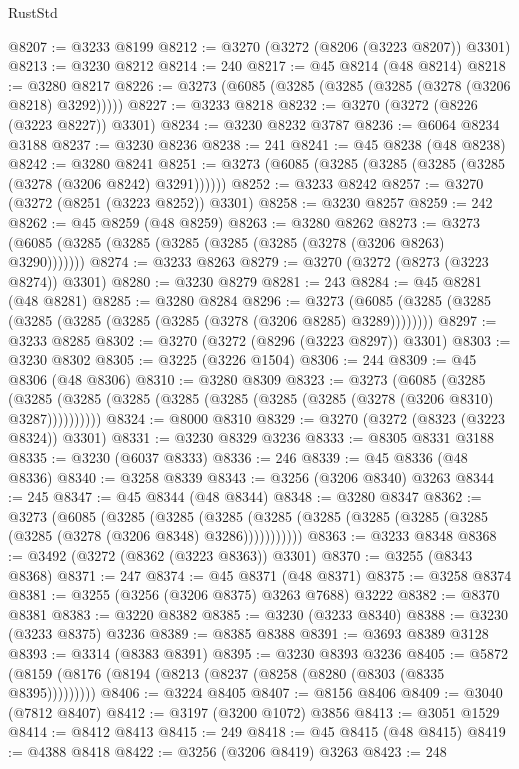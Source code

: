 \begin{lexlean}{RustStd}
\begin{coremodule}
@8207 := @3233 @8199
@8212 := @3270 (@3272 (@8206 (@3223 @8207)) @3301)
@8213 := @3230 @8212
@8214 := 240
@8217 := @45 @8214 (@48 @8214)
@8218 := @3280 @8217
@8226 := @3273 (@6085 (@3285 (@3285 (@3285 (@3278 (@3206 @8218) @3292)))))
@8227 := @3233 @8218
@8232 := @3270 (@3272 (@8226 (@3223 @8227)) @3301)
@8234 := @3230 @8232 @3787
@8236 := @6064 @8234 @3188
@8237 := @3230 @8236
@8238 := 241
@8241 := @45 @8238 (@48 @8238)
@8242 := @3280 @8241
@8251 := @3273 (@6085 (@3285 (@3285 (@3285 (@3285 (@3278 (@3206 @8242) @3291))))))
@8252 := @3233 @8242
@8257 := @3270 (@3272 (@8251 (@3223 @8252)) @3301)
@8258 := @3230 @8257
@8259 := 242
@8262 := @45 @8259 (@48 @8259)
@8263 := @3280 @8262
@8273 := @3273 (@6085 (@3285 (@3285 (@3285 (@3285 (@3285 (@3278 (@3206 @8263) @3290)))))))
@8274 := @3233 @8263
@8279 := @3270 (@3272 (@8273 (@3223 @8274)) @3301)
@8280 := @3230 @8279
@8281 := 243
@8284 := @45 @8281 (@48 @8281)
@8285 := @3280 @8284
@8296 := @3273 (@6085 (@3285 (@3285 (@3285 (@3285 (@3285 (@3285 (@3278 (@3206 @8285) @3289))))))))
@8297 := @3233 @8285
@8302 := @3270 (@3272 (@8296 (@3223 @8297)) @3301)
@8303 := @3230 @8302
@8305 := @3225 (@3226 @1504)
@8306 := 244
@8309 := @45 @8306 (@48 @8306)
@8310 := @3280 @8309
@8323 := @3273
    (@6085
      (@3285 (@3285 (@3285 (@3285 (@3285 (@3285 (@3285 (@3285 (@3278 (@3206 @8310) @3287))))))))))
@8324 := @8000 @8310
@8329 := @3270 (@3272 (@8323 (@3223 @8324)) @3301)
@8331 := @3230 @8329 @3236
@8333 := @8305 @8331 @3188
@8335 := @3230 (@6037 @8333)
@8336 := 246
@8339 := @45 @8336 (@48 @8336)
@8340 := @3258 @8339
@8343 := @3256 (@3206 @8340) @3263
@8344 := 245
@8347 := @45 @8344 (@48 @8344)
@8348 := @3280 @8347
@8362 := @3273
    (@6085
      (@3285
        (@3285
          (@3285 (@3285 (@3285 (@3285 (@3285 (@3285 (@3285 (@3278 (@3206 @8348) @3286)))))))))))
@8363 := @3233 @8348
@8368 := @3492 (@3272 (@8362 (@3223 @8363)) @3301)
@8370 := @3255 (@8343 @8368)
@8371 := 247
@8374 := @45 @8371 (@48 @8371)
@8375 := @3258 @8374
@8381 := @3255 (@3256 (@3206 @8375) @3263 @7688) @3222
@8382 := @8370 @8381
@8383 := @3220 @8382
@8385 := @3230 (@3233 @8340)
@8388 := @3230 (@3233 @8375) @3236
@8389 := @8385 @8388
@8391 := @3693 @8389 @3128
@8393 := @3314 (@8383 @8391)
@8395 := @3230 @8393 @3236
@8405 := @5872 (@8159 (@8176 (@8194 (@8213 (@8237 (@8258 (@8280 (@8303 (@8335 @8395)))))))))
@8406 := @3224 @8405
@8407 := @8156 @8406
@8409 := @3040 (@7812 @8407)
@8412 := @3197 (@3200 @1072) @3856
@8413 := @3051 @1529
@8414 := @8412 @8413
@8415 := 249
@8418 := @45 @8415 (@48 @8415)
@8419 := @4388 @8418
@8422 := @3256 (@3206 @8419) @3263
@8423 := 248

\end{coremodule}
\end{lexlean}
